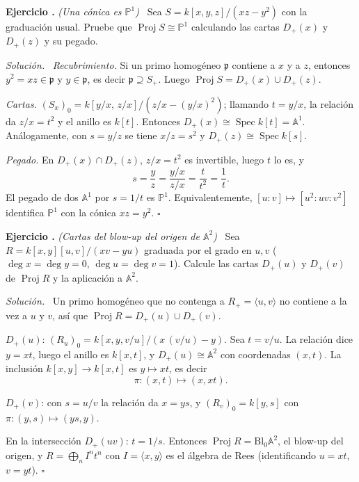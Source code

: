 \documentclass[11pt,a4paper]{article}
\newcommand{\Spec}{\operatorname{Spec}}
\newcommand{\Proj}{\operatorname{Proj}}
\newcommand{\A}{\mathbb{A}}
\newcommand{\PP}{\mathbb{P}}
\newcommand{\gen}[1]{\langle #1\rangle}
\newcommand{\p}{\mathfrak{p}}
\newcounter{ej}
\newenvironment{ejercicio}[1]{\refstepcounter{ej}\par\bigskip\noindent\textbf{Ejercicio \theej.} \emph{(#1)}\ }{\par}
\newenvironment{solucion}{\par\smallskip\noindent\textit{Solución.}\ }{\hfill$\square$\par}
\begin{document}
\begin{ejercicio}{Una cónica es $\PP^1$}
Sea $S=k[x,y,z]/(xz-y^2)$ con la graduación usual. Pruebe que $\Proj S\cong\PP^1$ calculando las cartas $D_+(x)$ y $D_+(z)$ y su pegado.
\end{ejercicio}
\begin{solucion}
\emph{Recubrimiento.} Si un primo homogéneo $\p$ contiene a $x$ y a $z$, entonces $y^2=xz\in\p$ y $y\in\p$, es decir $\p\supseteq S_+$. Luego $\Proj S=D_+(x)\cup D_+(z)$.

\emph{Cartas.} $(S_x)_0=k[y/x,\,z/x]/(z/x-(y/x)^2)$; llamando $t=y/x$, la relación da $z/x=t^2$ y el anillo es $k[t]$. Entonces $D_+(x)\cong\Spec k[t]=\A^1$. Análogamente, con $s=y/z$ se tiene $x/z=s^2$ y $D_+(z)\cong\Spec k[s]$.

\emph{Pegado.} En $D_+(x)\cap D_+(z)$, $z/x=t^2$ es invertible, luego $t$ lo es, y
$$s=\frac yz=\frac{y/x}{z/x}=\frac{t}{t^2}=\frac1t.$$
El pegado de dos $\A^1$ por $s=1/t$ es $\PP^1$. Equivalentemente, $[u:v]\mapsto[u^2:uv:v^2]$ identifica $\PP^1$ con la cónica $xz=y^2$.
\end{solucion}

\begin{ejercicio}{Cartas del blow-up del origen de $\A^2$}
Sea $R=k[x,y][u,v]/(xv-yu)$ graduada por el grado en $u,v$ ($\deg x=\deg y=0$, $\deg u=\deg v=1$). Calcule las cartas $D_+(u)$ y $D_+(v)$ de $\Proj R$ y la aplicación a $\A^2$.
\end{ejercicio}
\begin{solucion}
Un primo homogéneo que no contenga a $R_+=\gen{u,v}$ no contiene a la vez a $u$ y $v$, así que $\Proj R=D_+(u)\cup D_+(v)$.

$D_+(u)$: $(R_u)_0=k[x,y,v/u]/(x\,(v/u)-y)$. Sea $t=v/u$. La relación dice $y=xt$, luego el anillo es $k[x,t]$, y $D_+(u)\cong\A^2$ con coordenadas $(x,t)$. La inclusión $k[x,y]\to k[x,t]$ es $y\mapsto xt$, es decir
$$\pi:(x,t)\longmapsto(x,xt).$$

$D_+(v)$: con $s=u/v$ la relación da $x=ys$, y $(R_v)_0=k[y,s]$ con $\pi:(y,s)\mapsto(ys,y)$.

En la intersección $D_+(uv)$: $t=1/s$. Entonces $\Proj R=\mathrm{Bl}_0\A^2$, el blow-up del origen, y $R=\bigoplus_nI^nt^n$ con $I=\gen{x,y}$ es el álgebra de Rees (identificando $u=xt$, $v=yt$).
\end{solucion}
\end{document}
